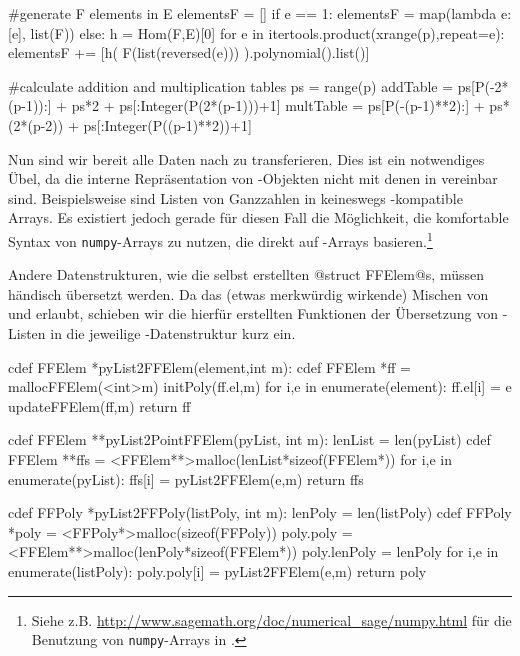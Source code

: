 \begin{sagecode}[caption={\texttt{countCompleteSubmoduleGenerators}
  Fortsetzung (II)}]
        #generate F elements in E
    elementsF = []
    if e == 1:
        elementsF = map(lambda e: [e], list(F))
    else:
        h = Hom(F,E)[0]
        for e in itertools.product(xrange(p),repeat=e):
            elementsF += [h( F(list(reversed(e))) ).polynomial().list()]

        #calculate addition and multiplication tables
    ps = range(p)
    addTable = ps[P(-2*(p-1)):] + ps*2 + ps[:Integer(P(2*(p-1)))+1]
    multTable = ps[P(-(p-1)**2):] + ps*(2*(p-2)) + ps[:Integer(P((p-1)**2))+1]
\end{sagecode}  


Nun sind wir bereit alle Daten nach \Clang zu transferieren. Dies ist ein
notwendiges Übel, da die interne Repräsentation von \sage-Objekten nicht mit
denen in \Clang vereinbar sind. Beispielsweise sind Listen von Ganzzahlen
in \sage keineswegs \Clang-kompatible Arrays. 
Es existiert jedoch gerade für diesen Fall die Möglichkeit,
die komfortable Syntax von \texttt{numpy}-Arrays zu nutzen, die direkt auf 
\Clang-Arrays basieren.\footnote{Siehe z.B.
\url{http://www.sagemath.org/doc/numerical_sage/numpy.html} für die Benutzung
von \texttt{numpy}-Arrays in \sage.}

Andere Datenstrukturen, wie die selbst erstellten @struct FFElem@s, müssen
händisch übersetzt werden. Da \cython das (etwas merkwürdig wirkende) Mischen
von \python und \Clang erlaubt, schieben wir die hierfür erstellten Funktionen
der Übersetzung von \python-Listen in die jeweilige \Clang-Datenstruktur kurz
ein.

\begin{sagecode}[caption={Aus \url{../Sage/enumeratePCNs.spyx}}]
cdef FFElem *pyList2FFElem(element,int m):
    cdef FFElem *ff = mallocFFElem(<int>m)
    initPoly(ff.el,m)
    for i,e in enumerate(element):
        ff.el[i] = e
    updateFFElem(ff,m)
    return ff
\end{sagecode}  

\begin{sagecode}[caption={Aus \url{../Sage/enumeratePCNs.spyx}}]
cdef FFElem **pyList2PointFFElem(pyList, int m):
    lenList = len(pyList)
    cdef FFElem **ffs = <FFElem**>malloc(lenList*sizeof(FFElem*))
    for i,e in enumerate(pyList):
        ffs[i] = pyList2FFElem(e,m)
    return ffs
\end{sagecode}

\begin{sagecode}[caption={Aus \url{../Sage/enumeratePCNs.spyx}}]
cdef FFPoly *pyList2FFPoly(listPoly, int m):
    lenPoly = len(listPoly)
    cdef FFPoly *poly = <FFPoly*>malloc(sizeof(FFPoly))
    poly.poly = <FFElem**>malloc(lenPoly*sizeof(FFElem*))
    poly.lenPoly = lenPoly
    for i,e in enumerate(listPoly):
        poly.poly[i] = pyList2FFElem(e,m)
    return poly
\end{sagecode}

